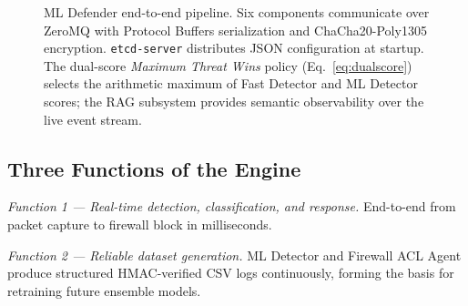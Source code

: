 \documentclass[11pt,a4paper]{article}
\begin{document}
\begin{figure}[ht]
        \caption{ML Defender end-to-end pipeline. Six components communicate over ZeroMQ with
        Protocol Buffers serialization and ChaCha20-Poly1305 encryption. \texttt{etcd-server}
        distributes JSON configuration at startup. The dual-score \emph{Maximum Threat Wins}
        policy (Eq.~\ref{eq:dualscore}) selects the arithmetic maximum of Fast Detector and
        ML Detector scores; the RAG subsystem provides semantic observability over the live
        event stream.}
        \label{fig:pipeline}
    \end{figure}

    \subsection{Three Functions of the Engine}

    \emph{Function 1 --- Real-time detection, classification, and response.}
    End-to-end from packet capture to firewall block in milliseconds.

    \emph{Function 2 --- Reliable dataset generation.}
    ML Detector and Firewall ACL Agent produce structured HMAC-verified CSV logs continuously,
    forming the basis for retraining future ensemble models.
\end{document}
